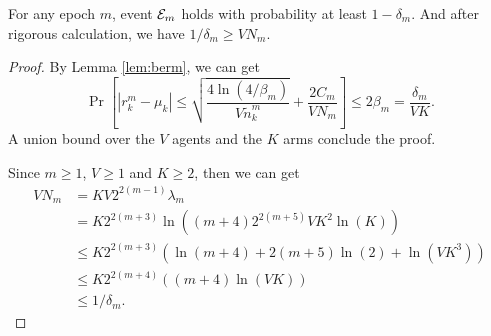 \begin{lemma}
\label{lem:pemm} %
     For any epoch $m$, event ${\mathcal{E}}_m$ holds with probability at least $1 - \delta_m$. And after rigorous calculation, we have $1 / \delta_m \geq V N_m$.
\end{lemma}
\begin{proof}
    By Lemma \ref{lem:berm}, we can get
    \[\Pr\left[|r_k^m - \mu_k| \leq \sqrt{\frac{4\ln(4/\beta_m)}{V \widetilde{n}_k^m}} + \frac{2C_m}{V N_m}\right] \leq 2\beta_m = \frac{\delta_m}{VK}.\]
    A union bound over the $V$ agents and the $K$ arms conclude the proof.

    Since $m \geq 1$, $V \geq 1$ and $K \geq 2$, then we can get
    \begin{align*}
        V N_m &= KV 2^{2(m-1)} \lambda_m \\
        &= K 2^{2(m+3)}\ln((m+4) 2^{2(m+5)} VK^2 \ln(K))  \\
        &\leq K 2^{2(m+3)} (\ln(m+4) + 2(m+5)\ln(2) + \ln(VK^3)) \\
        &\leq K 2^{2(m+4)} ((m + 4)\ln (VK)) \\
        &\leq 1 / \delta_m.
    \end{align*}
\end{proof}

